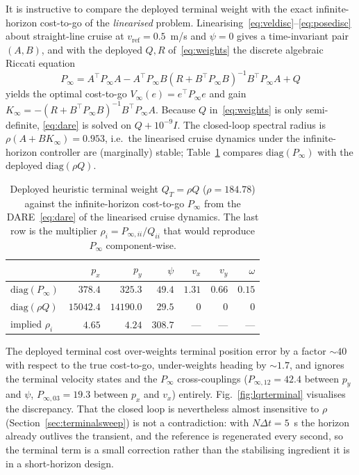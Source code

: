 \documentclass[11pt,a4paper]{article}
\begin{document}
It is instructive to compare the deployed terminal weight with the exact infinite-horizon cost-to-go of the
\emph{linearised} problem. Linearising~\eqref{eq:veldisc}--\eqref{eq:posedisc} about straight-line cruise at
$v_{\mathrm{ref}}=0.5$~m/s and $\psi=0$ gives a time-invariant pair $(A,B)$, and with the deployed
$Q,R$ of~\eqref{eq:weights} the discrete algebraic Riccati equation
\begin{equation}
  P_\infty = A^{\!\top}P_\infty A - A^{\!\top}P_\infty B\left(R+B^{\!\top}P_\infty B\right)^{-1}B^{\!\top}P_\infty A + Q
  \label{eq:dare}
\end{equation}
yields the optimal cost-to-go $V_\infty(e)=e^{\!\top}P_\infty e$ and gain
$K_\infty=-(R+B^{\!\top}P_\infty B)^{-1}B^{\!\top}P_\infty A$. Because $Q$ in~\eqref{eq:weights} is only
semi-definite, \eqref{eq:dare} is solved on $Q+10^{-9}I$. The closed-loop spectral radius is
$\rho(A+BK_\infty)=0.953$, i.e.\ the linearised cruise dynamics under the infinite-horizon controller are
(marginally) stable; Table~\ref{tab:dare} compares $\mathrm{diag}(P_\infty)$ with the deployed
$\mathrm{diag}(\rho Q)$.

\begin{table}[htbp]
  \centering
  \small
  \caption{Deployed heuristic terminal weight $Q_T=\rho Q$ ($\rho=184.78$) against the infinite-horizon
  cost-to-go $P_\infty$ from the DARE~\eqref{eq:dare} of the linearised cruise dynamics. The last row is the
  multiplier $\rho_i=P_{\infty,ii}/Q_{ii}$ that would reproduce $P_\infty$ component-wise.}
  \label{tab:dare}
  \begin{tabular}{lrrrrrr}
    \toprule
     & $p_x$ & $p_y$ & $\psi$ & $v_x$ & $v_y$ & $\omega$ \\
    \midrule
    $\mathrm{diag}(P_\infty)$   & $378.4$   & $325.3$   & $49.4$ & $1.31$ & $0.66$ & $0.15$ \\
    $\mathrm{diag}(\rho Q)$     & $15042.4$ & $14190.0$ & $29.5$ & $0$    & $0$    & $0$    \\
    implied $\rho_i$            & $4.65$    & $4.24$    & $308.7$& ---    & ---    & ---    \\
    \bottomrule
  \end{tabular}
\end{table}

The deployed terminal cost over-weights terminal position error by a factor ${\sim}40$ with respect to the
true cost-to-go, under-weights heading by ${\sim}1.7$, and ignores the terminal velocity states and the
$P_\infty$ cross-couplings ($P_{\infty,12}=42.4$ between $p_y$ and $\psi$, $P_{\infty,03}=19.3$ between $p_x$
and $v_x$) entirely. Fig.~\ref{fig:lqrterminal} visualises the discrepancy. That the closed loop is
nevertheless almost insensitive to $\rho$ (Section~\ref{sec:terminalsweep}) is not a contradiction: with
$N\Delta t=5$~s the horizon already outlives the transient, and the reference is regenerated every second, so
the terminal term is a small correction rather than the stabilising ingredient it is in a short-horizon
design.
\end{document}

